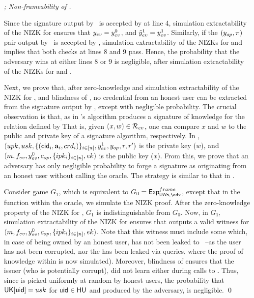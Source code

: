 \begin{proof}[; Non-frameability of \CUASGen]
  \label{prf:frame-uas}


  Since the signature output by \adv~is accepted by \Verify at line 4,
  simulation extractability of the NIZK for \RelSig ensures that $y_{ev} =
  y_{ev}^0$, and $\tilde{y}_{ev}^1 = y_{ev}^1$. Similarly, if the $(y_{op},\pi)$
  pair output by \adv~is accepted by \Judge, simulation extractability of
  the NIZKs for \RelSig and \RelIns implies that both checks at lines 8 and 9
  pass. Hence, the probability that the adversary wins at either lines 8 or 9 is
  negligible, after simulation extractability of the NIZKs for \RelSig and
  \RelIns.

  Next, we prove that, after zero-knowledge and simulation extractability of the
  NIZK for \RelSig, and blindness of \SBCM, no credential from an honest user
  can be extracted from the signature output by \adv, except with negligible
  probability.
  The crucial observation is that, as in \cite{cl06} \CUASGen's \Sign algorithm
  produces a signature of knowledge for the relation defined by \RelSig
  That is, given $(x,w) \in \mathcal{R}_{ev}$, one can compare $x$ and $w$ to
  the public and private key of a signature algorithm, respectively. In \RelSig,
  $(upk,usk,\lbrace (\mathsf{cid}_i,\mathbf{a}_i,
  crd_i)\rbrace_{i\in[n]},y_{ev}^1,y_{op},r,r')$ is the private key ($w$), and
  $(m,f_{ev},y_{ev}^0,c_{op},\lbrace ipk_i \rbrace_{i\in[n]},ek)$ is the
  public key ($x$).
  From this, we prove that an adversary has only negligible probability to forge
  a signature as originating from an honest user without calling the \SIGN
  oracle. The strategy is similar to that in \cite[Theorem 2.1]{cl06}.

  Consider game $G_1$, which is equivalent to $G_0 = \ExpNonframe$, except that
  in the \Sign function within the \SIGN oracle, we simulate the NIZK proof.
  After the zero-knowledge property of the NIZK for \RelSig, $G_1$ is
  indistinguishable from $G_0$. Now, in $G_1$, simulation extractability of
  the NIZK for \RelSig ensures that \ExtractSign outputs a valid
  witness for $(m,f_{ev},y_{ev}^0,c_{op},\lbrace ipk_i \rbrace_{i\in[n]},
  ek)$. Note that this witness must include some \usk which, in case of
  being owned by an honest user, has not been leaked to \adv~--as the user
  has not been corrupted, nor the \usk has been leaked via \SIGN queries,
  where the proof of knowledge within \Sign is now simulated). Moreover,
  blindness of \SBCM ensures that the issuer (who is potentially corrupt), did
  not learn \usk either during calls to \OBTAIN. Thus, since \usk is picked
  uniformly at random by honest users, the probability that $\mathsf{UK}[\mathsf{uid}] = usk$
  for $\mathsf{uid} \in \mathsf{HU}$ and \Sig produced by the adversary, is negligible.
  \qed
\end{proof}

